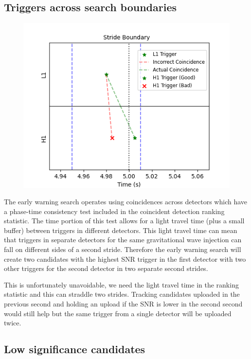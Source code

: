 \subsection{Triggers across search boundaries}
%
\begin{figure}
       \centering
    \includegraphics[width=\textwidth]{images/ew/trigs_across_bounds.png}
    \caption{}
    \label{fig:ew_trig_candidates_trig_plot}
\end{figure}
%
The early warning search operates using coincidences across detectors which have a phase-time consistency test included in the coincident detection ranking statistic. The time portion of this test allows for a light travel time (plus a small buffer) between triggers in different detectors. This light travel time can mean that triggers in separate detectors for the same gravitational wave injection can fall on different sides of a second stride. Therefore the early warning search will create two candidates with the highest SNR trigger in the first detector with two other triggers for the second detector in two separate second strides.

This is unfortunately unavoidable, we need the light travel time in the ranking statistic and this can straddle two strides. Tracking candidates uploaded in the previous second and holding an upload if the SNR is lower in the second second would still help but the same trigger from a single detector will be uploaded twice.

\subsection{Low significance candidates}

